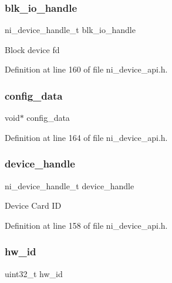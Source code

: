 \subsubsection{\texorpdfstring{blk\_io\_handle}{blk\_io\_handle}}
{\footnotesize\ttfamily ni\+\_\+device\+\_\+handle\+\_\+t blk\+\_\+io\+\_\+handle}

Block device fd 

Definition at line 160 of file ni\+\_\+device\+\_\+api.\+h.

\mbox{\label{struct__ni__session__config_a267857a8b9444f2da552625c8d5cd377}} 
\subsubsection{\texorpdfstring{config\_data}{config\_data}}
{\footnotesize\ttfamily void$\ast$ config\+\_\+data}



Definition at line 164 of file ni\+\_\+device\+\_\+api.\+h.

\mbox{\label{struct__ni__session__config_a4be6f6176ef1c1f36c9b873e0ac598ee}} 
\subsubsection{\texorpdfstring{device\_handle}{device\_handle}}
{\footnotesize\ttfamily ni\+\_\+device\+\_\+handle\+\_\+t device\+\_\+handle}

Device Card ID 

Definition at line 158 of file ni\+\_\+device\+\_\+api.\+h.

\mbox{\label{struct__ni__session__config_a6118a901150ca3895d21bdad25430334}} 
\subsubsection{\texorpdfstring{hw\_id}{hw\_id}}
{\footnotesize\ttfamily uint32\+\_\+t hw\+\_\+id}

